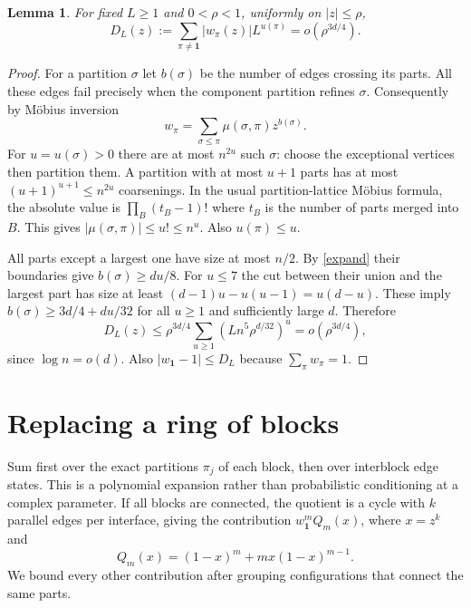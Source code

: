 \documentclass[11pt]{article}
\newtheorem{lemma}[theorem]{Lemma}
\newcommand{\one}{\boldsymbol{1}}
\begin{document}
\begin{lemma}\label{tail}
For fixed $L\ge1$ and $0<\rho<1$, uniformly on $|z|\le\rho$,
\[
 D_L(z):=\sum_{\pi\ne\one}|w_\pi(z)|L^{u(\pi)}
     =o(\rho^{3d/4}).
\]
\end{lemma}
\begin{proof}
For a partition $\sigma$ let $b(\sigma)$ be the number of edges crossing its parts. All these edges fail precisely when the component partition refines $\sigma$. Consequently by M\"obius inversion
\[
 w_\pi=\sum_{\sigma\le\pi}\mu(\sigma,\pi)z^{b(\sigma)}.
\]
For $u=u(\sigma)>0$ there are at most $n^{2u}$ such $\sigma$: choose the exceptional vertices then partition them. A partition with at most $u+1$ parts has at most $(u+1)^{u+1}\le n^{2u}$ coarsenings. In the usual partition-lattice M\"obius formula, the absolute value is $\prod_B(t_B-1)!$ where $t_B$ is the number of parts merged into $B$. This gives $|\mu(\sigma,\pi)|\le u!\le n^u$. Also $u(\pi)\le u$.

All parts except a largest one have size at most $n/2$. By \eqref{expand} their boundaries give $b(\sigma)\ge du/8$. For $u\le7$ the cut between their union and the largest part has size at least $(d-1)u-u(u-1)=u(d-u)$. These imply $b(\sigma)\ge3d/4+du/32$ for all $u\ge1$ and sufficiently large $d$. Therefore
\[
 D_L(z)\le \rho^{3d/4}\sum_{u\ge1}\left(Ln^5\rho^{d/32}\right)^u
 =o(\rho^{3d/4}),
\]
since $\log n=o(d)$. Also $|w_{\one}-1|\le D_L$ because $\sum_\pi w_\pi=1$.
\end{proof}
\section{Replacing a ring of blocks}
Sum first over the exact partitions $\pi_j$ of each block, then over interblock edge states. This is a polynomial expansion rather than probabilistic conditioning at a complex parameter. If all blocks are connected, the quotient is a cycle with $k$ parallel edges per interface, giving the contribution $w_{\one}^m Q_m(x)$, where $x=z^k$ and
\[
 Q_m(x)=(1-x)^m +mx(1-x)^{m-1}.
\]
We bound every other contribution after grouping configurations that connect the same parts.
\end{document}
